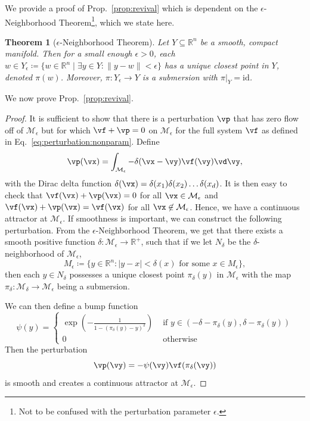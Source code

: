 \documentclass{article} %
\newcounter{ct}
\newcommand{\reals}{\mathbb{R}}
\newcommand{\manifold}{\mathcal{M}}
\newtheorem{theorem}{Theorem}
\theoremstyle{definition}
\theoremstyle{remark}
\newtheorem{remark}{Remark}
\begin{document}
We  provide a proof of Prop.~\ref{prop:revival} which is dependent on the \(\epsilon\)-Neighborhood Theorem\footnote{Not to be confused with the perturbation parameter \(\epsilon\).}, which we state here.

\begin{theorem}[\(\epsilon\)-Neighborhood Theorem\citep{guillemin2010differential}]
Let \( Y \subseteq \mathbb{R}^{n} \) be a smooth, compact manifold. Then for a small enough \(\epsilon > 0\),
each \( w \in Y_{\epsilon} \coloneqq \{ w \in \mathbb{R}^{n} \mid \exists y \in Y : \|y - w\| < \epsilon \} \)
has a unique closest point in \( Y \), denoted \( \pi(w) \).
Moreover, \( \pi: Y_{\epsilon} \to Y \) is a submersion with \( \pi|_{Y} = \text{id} \).
\end{theorem}


We now prove  Prop.~\ref{prop:revival}.
\begin{proof}%
It is sufficient to show that there is a perturbation \(\vp\) that has zero flow off of \(\manifold_{\epsilon}\) but for which \(\vf+\vp = 0\) on \(\manifold_{\epsilon}\) for the full system \(\vf\)  as defined in Eq.~\ref{eq:perturbation:nonparam}.
Define
\[\vp(\vx) = \int_{\manifold_{\epsilon}} - \delta(\vx-\vy)\vf(\vy)\vd\vy,\]
 with the Dirac delta function \(\delta(\vx)=\delta(x_{1})\delta(x_{2})\dots\delta(x_{d})\).
It is then easy to check that \(\vf(\vx)+\vp(\vx)=0\) for all \(\vx\in\manifold_{\epsilon}\) and \(\vf(\vx)+\vp(\vx)=\vf(\vx)\) for all \(\vx\not\in\manifold_{\epsilon}\).
Hence, we have a continuous attractor at \(\manifold_{\epsilon}\).
%
If smoothness is important, we can construct the following perturbation.
From the \(\epsilon\)-Neighborhood Theorem\citep{folland1999real}, we get that  there exists a smooth positive function \(\delta\colon \manifold_{\epsilon} \rightarrow \reals^+\),
 such that if we let \(N_{\delta}\) be the
\(\delta\)-neighborhood of \(\manifold_{\epsilon}\),
\[
M_{\epsilon}\coloneqq \{y  \in \reals^{n} : |y - x| < \delta(x) \text{ for some }  x \in M_{\epsilon}\},
\]
then each \(y\in N_{\delta}\) possesses a unique closest point \(\pi_{\delta}(y)\) in \(\manifold_{\epsilon}\) with the map \(\pi_{\delta}\colon \manifold_{\delta} \rightarrow \manifold_{\epsilon}\) being a submersion.

We can then define a bump function
\begin{equation}
\psi(y) =
\begin{cases}
\exp\left(-\frac{1}{1-(\pi_{\delta}(y)-y)^{2}}\right) &\text{  if  } y\in(-\delta-\pi_{\delta}(y), \delta-\pi_{\delta}(y))\\
0 & \text{  otherwise }
\end{cases}
\end{equation}
Then the perturbation
\[
\vp(\vy) = - \psi(\vy)\vf(\pi_{\delta}(\vy))
\]
is smooth and creates a continuous attractor at \(\manifold_{\epsilon}\).
\end{proof}
\end{document}
